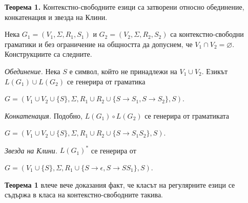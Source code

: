 \documentclass[openany]{book}
\begin{document}
    \vspace{15pt}

    \textbf{Теорема 1.} Контекстно-свободните езици са затворени относно обединение,
    конкатенация и звезда на Клини. \\

    \vspace{15pt}

    \hspace{15pt} Нека $G_1 = (V_1,\Sigma,R_1,S_1)$ и $G_2 = (V_2,\Sigma,R_2,S_2)$ са контекстно-свободни
    граматики и без ограничение
    на общността да допуснем, че $V_1 \cap V_2 = \varnothing$. Конструкциите са 
    следните. \\
    
    \vspace{5pt}
    
    \hspace{15pt}\textit{Обединение.} Нека $S$ е символ, който не принадлежи на $V_1 \cup V_2$.
    Езикът $L(G_1) \cup L(G_2)$ се генерира от граматика 
    \begin{center}
    $G = (V_1 \cup V_2 \cup \{S\}, \Sigma,R_1 \cup R_2 \cup \{S \rightarrow S_1, S \rightarrow S_2\},S)$.
    \end{center}

    \vspace{5pt}

    \hspace{15pt}\textit{Конкатенация.} Подобно, $L(G_1) \circ L(G_2)$ се генерира от 
    граматиката 
    \begin{center}
        $G = (V_1 \cup V_2 \cup \{S\},\Sigma,R_1 \cup R_2 \cup \{S \rightarrow S_1S_2\},S)$. \\
    \end{center}    

    \vspace{5pt}
    
    \hspace{15pt}\textit{Звезда на Клини.} $L(G_1)^*$ се генерира от \\
    \begin{center}
         $G = (V_1 \cup \{S\},\Sigma,R_1 \cup \{S \rightarrow \epsilon, S \rightarrow SS_1\},S)$.
    \end{center}

    \vspace{15pt}

    \hspace{15pt} \textbf{Теорема 1} влече вече доказания факт, че класът на регулярните
    езици се съдържа в класа на контекстно-свободните такива.
\vspace{25pt}
\end{document}
